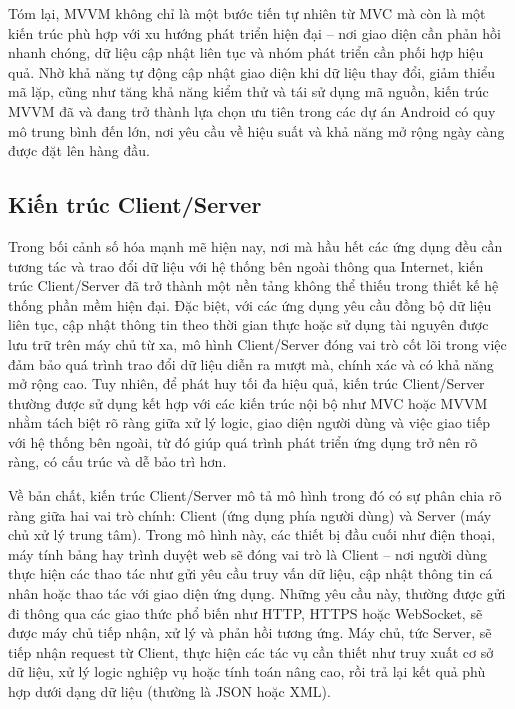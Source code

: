     \begin{flushleft}
      \hspace*{0.8cm}Tóm lại, MVVM không chỉ là một bước tiến tự nhiên từ MVC mà còn là một kiến trúc phù hợp với xu hướng phát triển hiện đại – nơi giao diện cần phản hồi nhanh chóng, dữ liệu cập nhật liên tục và nhóm phát triển cần phối hợp hiệu quả. Nhờ khả năng tự động cập nhật giao diện khi dữ liệu thay đổi, giảm thiểu mã lặp, cũng như tăng khả năng kiểm thử và tái sử dụng mã nguồn, kiến trúc MVVM đã và đang trở thành lựa chọn ưu tiên trong các dự án Android có quy mô trung bình đến lớn, nơi yêu cầu về hiệu suất và khả năng mở rộng ngày càng được đặt lên hàng đầu.
    \end{flushleft}

\subsection{Kiến trúc Client/Server}
\renewcommand{\labelitemi}{--}    
    \begin{flushleft}
        \hspace*{0.8cm}Trong bối cảnh số hóa mạnh mẽ hiện nay, nơi mà hầu hết các ứng dụng đều cần tương tác và trao đổi dữ liệu với hệ thống bên ngoài thông qua Internet, kiến trúc Client/Server đã trở thành một nền tảng không thể thiếu trong thiết kế hệ thống phần mềm hiện đại. Đặc biệt, với các ứng dụng yêu cầu đồng bộ dữ liệu liên tục, cập nhật thông tin theo thời gian thực hoặc sử dụng tài nguyên được lưu trữ trên máy chủ từ xa, mô hình Client/Server đóng vai trò cốt lõi trong việc đảm bảo quá trình trao đổi dữ liệu diễn ra mượt mà, chính xác và có khả năng mở rộng cao. Tuy nhiên, để phát huy tối đa hiệu quả, kiến trúc Client/Server thường được sử dụng kết hợp với các kiến trúc nội bộ như MVC hoặc MVVM nhằm tách biệt rõ ràng giữa xử lý logic, giao diện người dùng và việc giao tiếp với hệ thống bên ngoài, từ đó giúp quá trình phát triển ứng dụng trở nên rõ ràng, có cấu trúc và dễ bảo trì hơn.
    \end{flushleft}

    \begin{flushleft}
      \hspace*{0.8cm}Về bản chất, kiến trúc Client/Server mô tả mô hình trong đó có sự phân chia rõ ràng giữa hai vai trò chính: Client (ứng dụng phía người dùng) và Server (máy chủ xử lý trung tâm). Trong mô hình này, các thiết bị đầu cuối như điện thoại, máy tính bảng hay trình duyệt web sẽ đóng vai trò là Client – nơi người dùng thực hiện các thao tác như gửi yêu cầu truy vấn dữ liệu, cập nhật thông tin cá nhân hoặc thao tác với giao diện ứng dụng. Những yêu cầu này, thường được gửi đi thông qua các giao thức phổ biến như HTTP, HTTPS hoặc WebSocket, sẽ được máy chủ tiếp nhận, xử lý và phản hồi tương ứng. Máy chủ, tức Server, sẽ tiếp nhận request từ Client, thực hiện các tác vụ cần thiết như truy xuất cơ sở dữ liệu, xử lý logic nghiệp vụ hoặc tính toán nâng cao, rồi trả lại kết quả phù hợp dưới dạng dữ liệu (thường là JSON hoặc XML).
    \end{flushleft}

